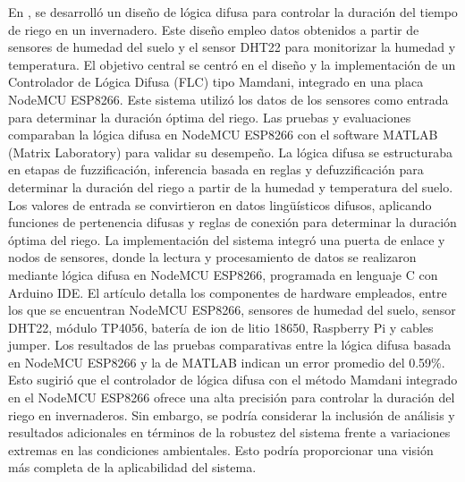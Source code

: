 \bigbreak
En \cite{widyawati_fuzzy_2022}, se desarrolló un diseño de lógica difusa para controlar la duración del tiempo de riego en un invernadero. Este diseño empleo datos obtenidos a partir de sensores de humedad del suelo y el sensor DHT22 para monitorizar la humedad y temperatura. El objetivo central se centró en el diseño y la implementación de un Controlador de Lógica Difusa (FLC) tipo Mamdani, integrado en una placa NodeMCU ESP8266. Este sistema utilizó los datos de los sensores como entrada para determinar la duración óptima del riego. Las pruebas y evaluaciones comparaban la lógica difusa en NodeMCU ESP8266 con el software MATLAB (Matrix Laboratory) para validar su desempeño. La lógica difusa se estructuraba en etapas de fuzzificación, inferencia basada en reglas y defuzzificación para determinar la duración del riego a partir de la humedad y temperatura del suelo. Los valores de entrada se convirtieron en datos lingüísticos difusos, aplicando funciones de pertenencia difusas y reglas de conexión para determinar la duración óptima del riego. La implementación del sistema integró una puerta de enlace y nodos de sensores, donde la lectura y procesamiento de datos se realizaron mediante lógica difusa en NodeMCU ESP8266, programada en lenguaje C con Arduino IDE. El artículo detalla los componentes de hardware empleados, entre los que se encuentran NodeMCU ESP8266, sensores de humedad del suelo, sensor DHT22, módulo TP4056, batería de ion de litio 18650, Raspberry Pi y cables jumper. Los resultados de las pruebas comparativas entre la lógica difusa basada en NodeMCU ESP8266 y la de MATLAB indican un error promedio del 0.59\%. Esto sugirió que el controlador de lógica difusa con el método Mamdani integrado en el NodeMCU ESP8266 ofrece una alta precisión para controlar la duración del riego en invernaderos. Sin embargo, se podría considerar la inclusión de análisis y resultados adicionales en términos de la robustez del sistema frente a variaciones extremas en las condiciones ambientales. Esto podría proporcionar una visión más completa de la aplicabilidad del sistema.


